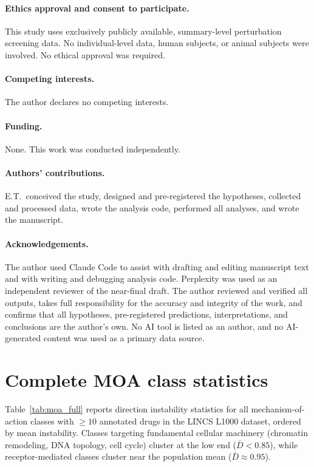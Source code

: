 \documentclass[11pt]{article}
\begin{document}
\paragraph{Ethics approval and consent to participate.}
This study uses exclusively publicly available, summary-level
perturbation screening data.  No individual-level data, human subjects,
or animal subjects were involved.  No ethical approval was required.

\paragraph{Competing interests.}
The author declares no competing interests.

\paragraph{Funding.}
None.  This work was conducted independently.

\paragraph{Authors' contributions.}
E.T.\ conceived the study, designed and pre-registered the hypotheses,
collected and processed data, wrote the analysis code, performed all
analyses, and wrote the manuscript.

\paragraph{Acknowledgements.}
The author used Claude Code \citep{claudecode} to assist with drafting
and editing manuscript text and with writing and debugging analysis
code.  Perplexity \citep{perplexityai} was used as an independent
reviewer of the near-final draft.  The author reviewed and verified all
outputs, takes full responsibility for the accuracy and integrity of the
work, and confirms that all hypotheses, pre-registered predictions,
interpretations, and conclusions are the author's own.  No AI tool is
listed as an author, and no AI-generated content was used as a primary
data source.




\appendix
\section{Complete MOA class statistics}
\label{app:moa}

Table~\ref{tab:moa_full} reports direction instability statistics for all
mechanism-of-action classes with $\geq 10$ annotated drugs in the LINCS L1000
dataset, ordered by mean instability. Classes targeting fundamental
cellular machinery (chromatin remodeling, DNA topology, cell cycle) cluster
at the low end ($\bar{D} < 0.85$), while receptor-mediated classes cluster
near the population mean ($\bar{D} \approx 0.95$).
\end{document}
